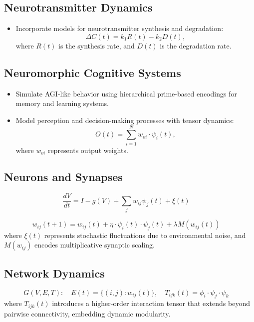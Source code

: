 \documentclass{article}
\theoremstyle{plain}
\begin{document}
\subsection{Neurotransmitter Dynamics}
\begin{itemize}
    \item Incorporate models for neurotransmitter synthesis and degradation:
    \[
    \Delta C(t) = k_1 R(t) - k_2 D(t),
    \]
    where \(R(t)\) is the synthesis rate, and \(D(t)\) is the degradation rate.
\end{itemize}

\subsection{Neuromorphic Cognitive Systems}
\begin{itemize}
    \item Simulate AGI-like behavior using hierarchical prime-based encodings for memory and learning systems.
    \item Model perception and decision-making processes with tensor dynamics:
    \[
    O(t) = \sum_{i=1}^N w_{oi} \cdot \psi_i(t),
    \]
    where \(w_{oi}\) represents output weights.
\end{itemize}
\subsection{Neurons and Synapses}
\begin{equation}
    \frac{dV}{dt} = I - g(V) + \sum_j w_{ij} \psi_j(t) + \xi(t) 
    \quad 
\end{equation}

\begin{equation}
    w_{ij}(t+1) = w_{ij}(t) + \eta \cdot \psi_i(t) \cdot \psi_j(t) + \lambda M(w_{ij}(t)) 
    \quad
\end{equation}
where $\xi(t)$ represents stochastic fluctuations due to environmental noise, and $M(w_{ij})$ encodes multiplicative synaptic scaling.

\subsection{Network Dynamics}
\begin{equation}
    G(V, E, T): \quad E(t) = \{(i, j): w_{ij}(t)\}, \quad 
    T_{ijk}(t) = \phi_i \cdot \psi_j \cdot \psi_k 
    \quad 
\end{equation}
where $T_{ijk}(t)$ introduces a higher-order interaction tensor that extends beyond pairwise connectivity, embedding dynamic modularity.
\end{document}
